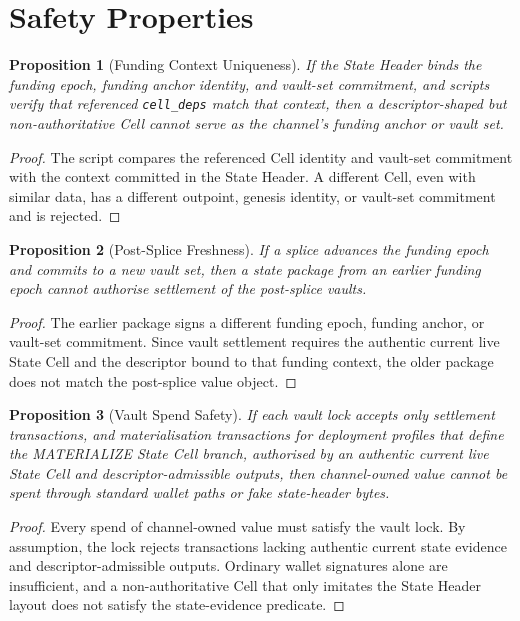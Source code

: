 \documentclass[a4paper,11pt]{article}
\newtheorem{proposition}{Proposition}
\begin{document}
\clearpage
\section{Safety Properties}

\begin{proposition}[Funding Context Uniqueness]
If the State Header binds the funding epoch, funding anchor identity, and vault-set commitment, and scripts verify that referenced \texttt{cell\_deps} match that context, then a descriptor-shaped but non-authoritative Cell cannot serve as the channel's funding anchor or vault set.
\end{proposition}

\begin{proof}
The script compares the referenced Cell identity and vault-set commitment with the context committed in the State Header. A different Cell, even with similar data, has a different outpoint, genesis identity, or vault-set commitment and is rejected.
\end{proof}

\begin{proposition}[Post-Splice Freshness]
If a splice advances the funding epoch and commits to a new vault set, then a state package from an earlier funding epoch cannot authorise settlement of the post-splice vaults.
\end{proposition}

\begin{proof}
The earlier package signs a different funding epoch, funding anchor, or vault-set commitment. Since vault settlement requires the authentic current live State Cell and the descriptor bound to that funding context, the older package does not match the post-splice value object.
\end{proof}

\begin{proposition}[Vault Spend Safety]
If each vault lock accepts only settlement transactions, and materialisation transactions for deployment profiles that define the \textsf{MATERIALIZE} State Cell branch, authorised by an authentic current live State Cell and descriptor-admissible outputs, then channel-owned value cannot be spent through standard wallet paths or fake state-header bytes.
\end{proposition}

\begin{proof}
Every spend of channel-owned value must satisfy the vault lock. By assumption, the lock rejects transactions lacking authentic current state evidence and descriptor-admissible outputs. Ordinary wallet signatures alone are insufficient, and a non-authoritative Cell that only imitates the State Header layout does not satisfy the state-evidence predicate.
\end{proof}
\end{document}
